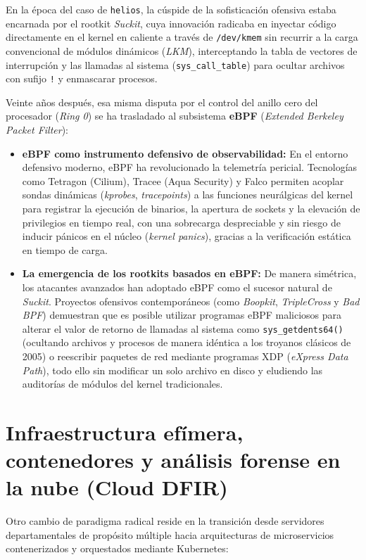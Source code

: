 En la época del caso de \texttt{helios}, la cúspide de la sofisticación ofensiva estaba encarnada por el rootkit \textit{Suckit}, cuya innovación radicaba en inyectar código directamente en el kernel en caliente a través de \texttt{/dev/kmem} sin recurrir a la carga convencional de módulos dinámicos (\textit{LKM}), interceptando la tabla de vectores de interrupción y las llamadas al sistema (\texttt{sys\_call\_table}) para ocultar archivos con sufijo \texttt{!} y enmascarar procesos.

Veinte años después, esa misma disputa por el control del anillo cero del procesador (\textit{Ring 0}) se ha trasladado al subsistema \textbf{eBPF} (\textit{Extended Berkeley Packet Filter}):

\begin{itemize}
    \item \textbf{eBPF como instrumento defensivo de observabilidad:} En el entorno defensivo moderno, eBPF ha revolucionado la telemetría pericial. Tecnologías como Tetragon (Cilium), Tracee (Aqua Security) y Falco permiten acoplar sondas dinámicas (\textit{kprobes}, \textit{tracepoints}) a las funciones neurálgicas del kernel para registrar la ejecución de binarios, la apertura de sockets y la elevación de privilegios en tiempo real, con una sobrecarga despreciable y sin riesgo de inducir pánicos en el núcleo (\textit{kernel panics}), gracias a la verificación estática en tiempo de carga.
    \item \textbf{La emergencia de los rootkits basados en eBPF:} De manera simétrica, los atacantes avanzados han adoptado eBPF como el sucesor natural de \textit{Suckit}. Proyectos ofensivos contemporáneos (como \textit{Boopkit}, \textit{TripleCross} y \textit{Bad BPF}) demuestran que es posible utilizar programas eBPF maliciosos para alterar el valor de retorno de llamadas al sistema como \texttt{sys\_getdents64()} (ocultando archivos y procesos de manera idéntica a los troyanos clásicos de 2005) o reescribir paquetes de red mediante programas XDP (\textit{eXpress Data Path}), todo ello sin modificar un solo archivo en disco y eludiendo las auditorías de módulos del kernel tradicionales.
\end{itemize}

\section{Infraestructura efímera, contenedores y análisis forense en la nube (Cloud DFIR)}

Otro cambio de paradigma radical reside en la transición desde servidores departamentales de propósito múltiple hacia arquitecturas de microservicios contenerizados y orquestados mediante Kubernetes:

